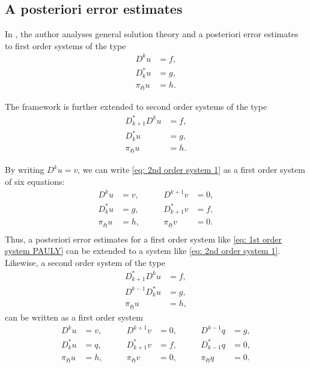 \documentclass[reqno]{amsart}
\numberwithin{equation}{section}
\theoremstyle{definition}
\newcommand{\Hf}{\mathfrak{H}}
\begin{document}
%
%
%
%
%
%
%
\subsection{A posteriori error estimates} \label{subsection: a posteriori}
In \cite{pauly2020solution}, the author analyses general solution theory and a posteriori error estimates to first order systems of the type
\begin{subequations} \label{eq: 1st order system PAULY}
\begin{align} 
D^ku &= f, \\
D_k^*u &= g, \\
\pi_\Hf u &= h.
\end{align}
\end{subequations}

The framework is further extended to second order systems of the type
\begin{subequations} \label{eq: 2nd order system 1}
\begin{align} 
D^*_{k+1} D^ku &= f, \\
D_k^*u &= g, \\
\pi_\Hf u &= h.
\end{align}
\end{subequations}

By writing $D^k u = v$, we can write \cref{eq: 2nd order system 1} as a first order system of six equations:
\begin{subequations}
\begin{align}
D^ku &= v, \qquad & D^{k+1} v &= 0, \\
D_k^*u &= g, \qquad &D^*_{k+1} v &= f, \\
\pi_\Hf u &= h, \qquad &\pi_\Hf v &= 0. \\
\end{align}
\end{subequations}
Thus, a posteriori error estimates for a first order system like \cref{eq: 1st order system PAULY} can be extended to a system like \cref{eq: 2nd order system 1}. Likewise, a second order system of the type
\begin{subequations}  \label{eq: second order system 2}
\begin{align} 
D^*_{k+1} D^ku &= f, \\
D^{k-1}D_k^*u &= g, \\
\pi_\Hf u &= h,
\end{align}
\end{subequations}
can be written as a first order system
\begin{subequations} \label{eq: second order system 2 firstO}
\begin{align} 
D^ku &= v, \qquad &D^{k+1} v &= 0, \qquad &D^{k-1}q &= g, \\
D_k^*u &= q, \qquad &D^*_{k+1} v &= f, \qquad &D^*_{k-1}q &= 0, \\
\pi_\Hf u &= h, \qquad &\pi_\Hf v &= 0, \qquad &\pi_\Hf q &= 0. \end{align}
\end{subequations}
\end{document}
